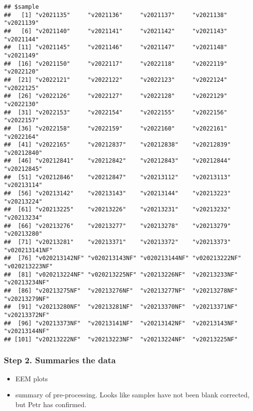\documentclass[
]{article}
\providecommand{\tightlist}{%
  \setlength{\itemsep}{0pt}\setlength{\parskip}{0pt}}
\begin{document}
\begin{verbatim}
## $sample
##   [1] "v2021135"     "v2021136"     "v2021137"     "v2021138"     "v2021139"    
##   [6] "v2021140"     "v2021141"     "v2021142"     "v2021143"     "v2021144"    
##  [11] "v2021145"     "v2021146"     "v2021147"     "v2021148"     "v2021149"    
##  [16] "v2021150"     "v2022117"     "v2022118"     "v2022119"     "v2022120"    
##  [21] "v2022121"     "v2022122"     "v2022123"     "v2022124"     "v2022125"    
##  [26] "v2022126"     "v2022127"     "v2022128"     "v2022129"     "v2022130"    
##  [31] "v2022153"     "v2022154"     "v2022155"     "v2022156"     "v2022157"    
##  [36] "v2022158"     "v2022159"     "v2022160"     "v2022161"     "v2022164"    
##  [41] "v2022165"     "v20212837"    "v20212838"    "v20212839"    "v20212840"   
##  [46] "v20212841"    "v20212842"    "v20212843"    "v20212844"    "v20212845"   
##  [51] "v20212846"    "v20212847"    "v20213112"    "v20213113"    "v20213114"   
##  [56] "v20213142"    "v20213143"    "v20213144"    "v20213223"    "v20213224"   
##  [61] "v20213225"    "v20213226"    "v20213231"    "v20213232"    "v20213234"   
##  [66] "v20213276"    "v20213277"    "v20213278"    "v20213279"    "v20213280"   
##  [71] "v20213281"    "v20213371"    "v20213372"    "v20213373"    "v020213141NF"
##  [76] "v020213142NF" "v020213143NF" "v020213144NF" "v020213222NF" "v020213223NF"
##  [81] "v020213224NF" "v020213225NF" "v20213226NF"  "v20213233NF"  "v20213234NF" 
##  [86] "v20213275NF"  "v20213276NF"  "v20213277NF"  "v20213278NF"  "v20213279NF" 
##  [91] "v20213280NF"  "v20213281NF"  "v20213370NF"  "v20213371NF"  "v20213372NF" 
##  [96] "v20213373NF"  "v20213141NF"  "v20213142NF"  "v20213143NF"  "v20213144NF" 
## [101] "v20213222NF"  "v20213223NF"  "v20213224NF"  "v20213225NF"
\end{verbatim}

\hypertarget{step-2.-summaries-the-data}{%
\subsubsection{Step 2. Summaries the
data}\label{step-2.-summaries-the-data}}

\begin{itemize}
\tightlist
\item
  EEM plots
\item
  summary of pre-processing. Looks like samples have not been blank
  corrected, but Petr has confirmed.
\end{itemize}
\end{document}
